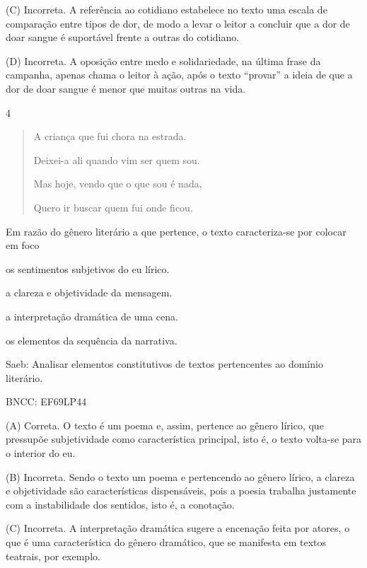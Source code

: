 (C) Incorreta. A referência ao cotidiano estabelece no texto uma escala
de comparação entre tipos de dor, de modo a levar o leitor a concluir
que a dor de doar sangue é suportável frente a outras do cotidiano.

(D) Incorreta. A oposição entre medo e solidariedade, na última frase da
campanha, apenas chama o leitor à ação, após o texto ``provar'' a ideia
de que a dor de doar sangue é menor que muitas outras na vida.

\num{4}

\begin{quote}
A criança que fui chora na estrada.

Deixei-a ali quando vim ser quem sou.

Mas hoje, vendo que o que sou é nada,

Quero ir buscar quem fui onde ficou.
\end{quote}


Em razão do gênero literário a que pertence, o texto caracteriza-se por
colocar em foco

\begin{escolha}
\item os sentimentos subjetivos do eu lírico.

\item a clareza e objetividade da mensagem.

\item a interpretação dramática de uma cena.

\item os elementos da sequência da narrativa.
\end{escolha}

Saeb: Analisar elementos constitutivos de textos pertencentes ao domínio
literário.

BNCC: EF69LP44

(A) Correta. O texto é um poema e, assim, pertence ao gênero lírico, que
pressupõe subjetividade como característica principal, isto é, o texto
volta-se para o interior do eu.

(B) Incorreta. Sendo o texto um poema e pertencendo ao gênero lírico, a
clareza e objetividade são características dispensáveis, pois a poesia
trabalha justamente com a instabilidade dos sentidos, isto é, a
conotação.

(C) Incorreta. A interpretação dramática sugere a encenação feita por
atores, o que é uma característica do gênero dramático, que se manifesta
em textos teatrais, por exemplo.

